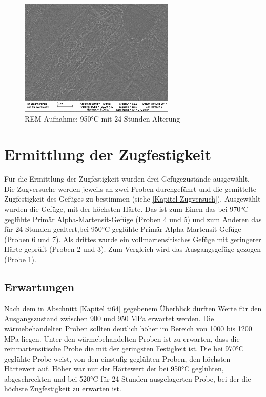 \documentclass[a4paper, 11pt]{tubsreprt}
\begin{document}
\begin{figure}
\centering
\includegraphics[width=0.66\textwidth]{Bilder/REM950C1hWQ520C24hAC.png}
\caption{REM Aufnahme: 950°C mit 24 Stunden Alterung}
\label{REM 950C 24h}
\end{figure}

\section{Ermittlung der Zugfestigkeit}

Für die Ermittlung der Zugfestigkeit wurden drei Gefügezustände ausgewählt. Die Zugversuche werden jeweils an zwei Proben durchgeführt und die gemittelte Zugfestigkeit des Gefüges zu bestimmen (siehe  \ref{Kapitel Zugversuch}). Ausgewählt wurden die Gefüge, mit der höchsten Härte. Das ist zum Einen das bei 970°C geglühte Primär Alpha-Martensit-Gefüge (Proben 4 und 5) und zum Anderen das für 24 Stunden gealtert,bei 950°C geglühte Primär Alpha-Martensit-Gefüge (Proben 6 und 7). Als drittes wurde ein vollmartensitisches Gefüge mit geringerer Härte geprüft (Proben 2 und 3). Zum Vergleich wird das Ausgangsgefüge gezogen (Probe 1).
\subsection*{Erwartungen}
Nach dem in Abschnitt \ref{Kapitel ti64} gegebenem Überblick dürften Werte für den Ausgangszustand zwischen 900 und 950 MPa erwartet werden. Die wärmebehandelten Proben sollten deutlich höher im Bereich von 1000 bis 1200 MPa liegen. Unter den wärmebehandelten Proben ist zu erwarten, dass die reinmartensitische Probe die mit der geringsten Festigkeit ist. Die bei 970°C geglühte Probe weist, von den einstufig geglühten Proben, den höchsten Härtewert auf. Höher war nur der Härtewert der bei 950°C geglühten, abgeschreckten und bei 520°C für 24 Stunden ausgelagerten Probe, bei der die höchste Zugfestigkeit zu erwarten ist.
\end{document}
